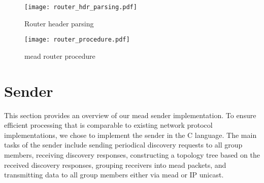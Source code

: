 %
\begin{figure}
    \begin{center}
        \texttt{[image: router\_hdr\_parsing.pdf]}
    \end{center}
    \caption{Router header parsing}
    \label{fig:router_hdr_parsing}
\end{figure}

\begin{figure}
    \begin{center}
        \texttt{[image: router\_procedure.pdf]}
    \end{center}
    \caption{\gls{mead} router procedure}
    \label{fig:router_procedure}
\end{figure}


\section{Sender} %
\label{sec:Sender}
This section provides an overview of our \gls{mead} sender implementation.
To ensure efficient processing that is comparable to existing network
    protocol implementations, we chose to implement the sender in the C
    language.
The main tasks of the sender include sending periodical discovery requests to
    all group members, receiving discovery responses, constructing a topology
    tree based on the received discovery responses, grouping receivers into
    \gls{mead} packets, and transmitting data to all group members either via
    \gls{mead} or IP unicast.

